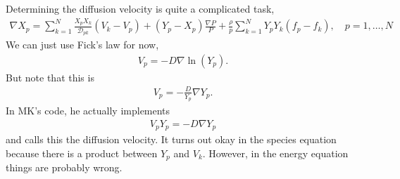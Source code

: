 \documentclass[fontsize=11pt, %
               paper=a4, %
               oneside, %
               captions=tableheading,
               index=totoc,
               hyperref]{labbook}
\newcommand{\lr}[1]{\left(#1\right)}
\begin{document}
\begin{tcolorbox}[colback=green!5,colframe=green!40!black,title=A note on the diffusion velocity:]
Determining the diffusion velocity is quite a complicated task,
\begin{align*}
  \nabla X_{p} = \sum_{k=1}^{N}{\frac{X_{p}X_{k}}{\mathcal{D}_{pk}}\lr{V_{k} - V_{p}}} + \lr{Y_{p} - X_{p}}\frac{\nabla P}{P} + \frac{\rho}{p}\sum_{k=1}^{N}{Y_{p}Y_{k}\lr{f_{p} - f_{k}}}, \quad  p = 1,\ldots,N
\end{align*}
We can just use Fick's law for now,
\begin{align*}
  V_{p} = -D\nabla\ln\lr{Y_{p}}.
\end{align*}
But note that this is
\begin{align*}
  V_{p} = -\frac{D}{Y_{p}}\nabla Y_{p}.
\end{align*}
In MK's code, he actually implements
\begin{align*}
  V_{p}Y_{p} = -D\nabla Y_{p}
\end{align*}
and calls this the diffusion velocity.  It turns out okay in the species equation because there is a product between $Y_{p}$ and $V_{k}$.  However, in the energy equation things are probably wrong.
\end{tcolorbox}




\end{document}

